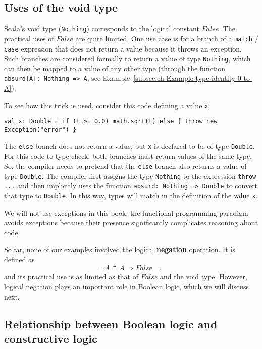 \subsection{Uses of the void type}

Scala's void type (\lstinline!Nothing!) corresponds
to the logical constant $False$. The practical uses of $False$ are
quite limited. One use case is for a branch of a \lstinline!match!
/ \lstinline!case! expression that does not return a value because
it throws an exception. Such branches are considered
formally to return a value of type \lstinline!Nothing!, which can
then be mapped to a value of any other type (through the function
\lstinline!absurd[A]: Nothing => A!, see Example~\ref{subsec:ch-Example-type-identity-0-to-A}). 

To see how this trick is used, consider this code defining a value
\lstinline!x!,
\begin{lstlisting}
val x: Double = if (t >= 0.0) math.sqrt(t) else { throw new Exception("error") }
\end{lstlisting}
The \lstinline!else! branch does not return a value, but \lstinline!x!
is declared to be of type \lstinline!Double!. For this code to type-check,
both branches must return values of the same type. So, the compiler
needs to pretend that the \lstinline!else! branch also returns a
value of type \lstinline!Double!. The compiler first assigns the
type \lstinline!Nothing! to the expression \lstinline!throw ...!
and then implicitly uses the function \lstinline!absurd: Nothing => Double!
to convert that type to \lstinline!Double!. In this way, types will
match in the definition of the value \lstinline!x!. 

We will not use exceptions in this book: the functional programming
paradigm avoids exceptions because their presence significantly complicates
reasoning about code.

So far, none of our examples involved the logical \textbf{negation}
operation. It is defined as 
\[
\neg A\triangleq A\Rightarrow False\quad,
\]
and its practical use is as limited as that of $False$ and the void
type. However, logical negation plays an important role in Boolean
logic, which we will discuss next.

\subsection{Relationship between Boolean logic and constructive logic\label{subsec:Relationship-between-Boolean} }

